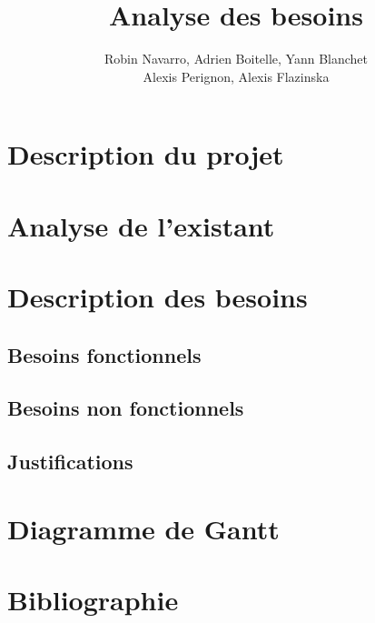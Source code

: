 \documentclass{article}
\title{Analyse des besoins}
\author{Robin Navarro, Adrien Boitelle, Yann Blanchet\\Alexis Perignon, Alexis Flazinska}
\begin{document}
    \maketitle
    \section{Description du projet}
    \section{Analyse de l'existant}
    \section{Description des besoins}
        \subsection{Besoins fonctionnels}
        \subsection{Besoins non fonctionnels}
        \subsection{Justifications}
    \section{Diagramme de Gantt}
    \section{Bibliographie}
    
\end{document}
